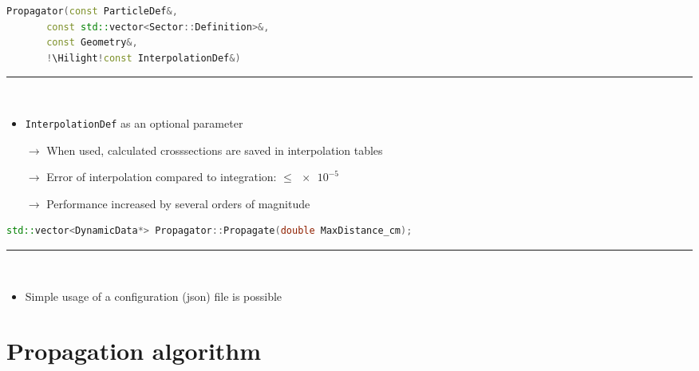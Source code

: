 \documentclass[aspectratio=1610, captions=tableheading, 11pt]{beamer}
\newcommand{\Hilight}{\makebox[0pt][l]{\color{tugreen}\rule[-4pt]{0.65\linewidth}{14pt}}}
\begin{document}
\begin{frame}[fragile]
\begin{lstlisting}[language=C++,basicstyle=\ttfamily,keywordstyle=\color{red}, escapechar=\!]
Propagator(const ParticleDef&,
	   const std::vector<Sector::Definition>&,
	   const Geometry&,
	   !\Hilight!const InterpolationDef&)
\end{lstlisting}
	\textcolor{tugreen}{\rule{\textwidth}{1pt}}\\%
    \begin{itemize}
      \setlength\itemsep{0.5em}
      \item \texttt{InterpolationDef} as an optional parameter
      \item [$\rightarrow$] When used, calculated crosssections are saved in interpolation tables
      \item [$\rightarrow$] Error of interpolation compared to integration: $\leq \num{e-5}$
      \item [$\rightarrow$] Performance increased by several orders of magnitude
    \end{itemize}
\end{frame}

\begin{frame}[fragile]
\begin{lstlisting}[language=C++,basicstyle=\ttfamily,keywordstyle=\color{red}, escapechar=\!]
std::vector<DynamicData*> Propagator::Propagate(double MaxDistance_cm);
\end{lstlisting}
	\textcolor{tugreen}{\rule{\textwidth}{1pt}}\\%
    \begin{itemize}
      \setlength\itemsep{0.5em}
      \item Simple usage of a configuration (json) file is possible
    \end{itemize}
\end{frame}

\section{Propagation algorithm}
\end{document}
